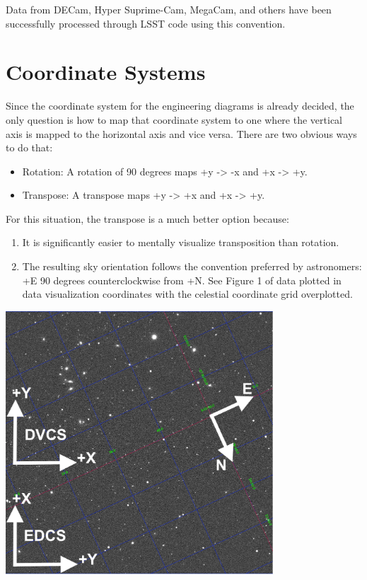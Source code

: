 Data from DECam, Hyper Suprime-Cam, MegaCam, and others have been successfully processed through LSST code using this convention.

\section{Coordinate Systems}
Since the coordinate system for the engineering diagrams is already decided, the only question is how to map that coordinate system to one where the vertical axis is mapped to the horizontal axis and vice versa. There are two obvious ways to do that:

\begin{itemize}
\item Rotation: A rotation of 90 degrees maps +y -> -x and +x -> +y.
\item Transpose: A transpose maps +y -> +x and +x -> +y.
\end{itemize}

For this situation, the transpose is a much better option because:

\begin{enumerate}
\item It is significantly easier to mentally visualize transposition than rotation.
\item The resulting sky orientation follows the convention preferred by astronomers: +E 90 degrees counterclockwise from +N.  See Figure 1 of data plotted in data visualization coordinates with the celestial coordinate grid overplotted.
\end{enumerate}

\begin{center}
\includegraphics[width=0.75\textwidth]{figures/ds9_coords_with_arrows.png}
\end{center}

